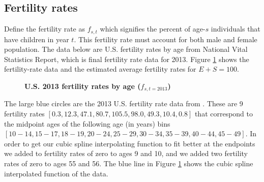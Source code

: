 \documentclass[letterpaper,12pt]{article}
\theoremstyle{definition}
\begin{document}
  \subsection{Fertility rates}\label{SecFert}

    Define the fertility rate as $f_{s,t}$ which signifies the percent of age-$s$ individuals that have children in year $t$. This fertility rate must account for both male and female population. The data below are U.S. fertility rates by age from \citet[Table 3, p. 18]{MartinEtAl:2015} National Vital Statistics Report, which is final fertility rate data for 2013. Figure \ref{FigFertRates} shows the fertility-rate data and the estimated average fertility rates for $E+S=100$.

    \begin{figure}[htbp]\centering \captionsetup{width=4.0in}
      \caption{\label{FigFertRates}\textbf{U.S. 2013 fertility rates by age ($f_{s,t=2013}$)}}
    \end{figure}

    The large blue circles are the 2013 U.S. fertility rate data from \citet{MartinEtAl:2015}. These are 9 fertility rates $[0.3, 12.3, 47.1, 80.7, 105.5, 98.0, 49.3, 10.4, 0.8]$ that correspond to the midpoint ages of the following age (in years) bins $[10-14, 15-17, 18-19, 20-24, 25-29, 30-34, 35-39, 40-44, 45-49]$. In order to get our cubic spline interpolating function to fit better at the endpoints we added to fertility rates of zero to ages 9 and 10, and we added two fertility rates of zero to ages 55 and 56. The blue line in Figure \ref{FigFertRates} shows the cubic spline interpolated function of the data.
\end{document}

